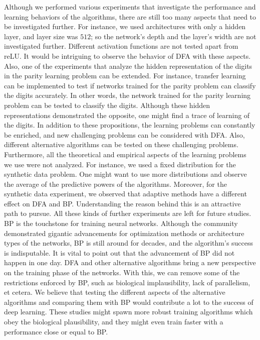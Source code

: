 \documentclass[a4paper, nobind]{templates/ociamthesis}
\begin{document}
Although we performed various experiments that investigate the performance and learning behaviors of the algorithms, there are still too many aspects that need to be investigated further. For instance, we used architectures with only a hidden layer, and layer size was \(512\); so the network's depth and the layer's width are not investigated further. Different activation functions are not tested apart from reLU. It would be intriguing to observe the behavior of DFA with these aspects. Also, one of the experiments that analyze the hidden representation of the digits in the parity learning problem can be extended. For instance, transfer learning can be implemented to test if networks trained for the parity problem can classify the digits accurately. In other words, the network trained for the parity learning problem can be tested to classify the digits. Although these hidden representations demonstrated the opposite, one might find a trace of learning of the digits. In addition to these propositions, the learning problems can constantly be enriched, and new challenging problems can be considered with DFA. Also, different alternative algorithms can be tested on these challenging problems. Furthermore, all the theoretical and empirical aspects of the learning problems we use were not analyzed. For instance, we used a fixed distribution for the synthetic data problem. One might want to use more distributions and observe the average of the predictive powers of the algorithms. Moreover, for the synthetic data experiment, we observed that adaptive methods have a different effect on DFA and BP. Understanding the reason behind this is an attractive path to pursue. All these kinds of further experiments are left for future studies.\\
BP is the touchstone for training neural networks. Although the community demonstrated gigantic advancements for optimization methods or architecture types of the networks, BP is still around for decades, and the algorithm's success is indisputable. It is vital to point out that the advancement of BP did not happen in one day. DFA and other alternative algorithms bring a new perspective on the training phase of the networks. With this, we can remove some of the restrictions enforced by BP, such as biological implausibility, lack of parallelism, et cetera. We believe that testing the different aspects of the alternative algorithms and comparing them with BP would contribute a lot to the success of deep learning. These studies might spawn more robust training algorithms which obey the biological plausibility, and they might even train faster with a performance close or equal to BP.~
\end{document}
